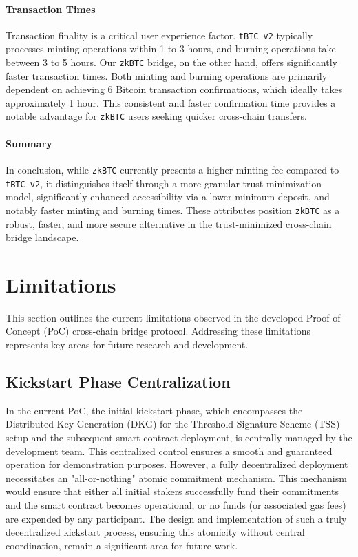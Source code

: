 \documentclass{DESSThesis}
\newcommand{\zktoken}{\texttt{zkBTC}}
\begin{document}
\paragraph{Transaction Times}
Transaction finality is a critical user experience factor. \texttt{tBTC v2} typically processes minting operations within 1 to 3 hours, and burning operations take between 3 to 5 hours. Our \texttt{\zktoken} bridge, on the other hand, offers significantly faster transaction times. Both minting and burning operations are primarily dependent on achieving 6 Bitcoin transaction confirmations, which ideally takes approximately 1 hour. This consistent and faster confirmation time provides a notable advantage for \texttt{\zktoken} users seeking quicker cross-chain transfers.

\paragraph{Summary}
In conclusion, while \texttt{\zktoken} currently presents a higher minting fee compared to \texttt{tBTC v2}, it distinguishes itself through a more granular trust minimization model, significantly enhanced accessibility via a lower minimum deposit, and notably faster minting and burning times. These attributes position \texttt{\zktoken} as a robust, faster, and more secure alternative in the trust-minimized cross-chain bridge landscape.


\section{Limitations} \label{sec:limitations}
This section outlines the current limitations observed in the developed Proof-of-Concept (PoC) cross-chain bridge protocol. Addressing these limitations represents key areas for future research and development.

\subsection{Kickstart Phase Centralization} \label{subsec:kickstart_limitation}
In the current PoC, the initial kickstart phase, which encompasses the Distributed Key Generation (DKG) for the Threshold Signature Scheme (TSS) setup and the subsequent smart contract deployment, is centrally managed by the development team. This centralized control ensures a smooth and guaranteed operation for demonstration purposes. However, a fully decentralized deployment necessitates an "all-or-nothing" atomic commitment mechanism. This mechanism would ensure that either all initial stakers successfully fund their commitments and the smart contract becomes operational, or no funds (or associated gas fees) are expended by any participant. The design and implementation of such a truly decentralized kickstart process, ensuring this atomicity without central coordination, remain a significant area for future work.
\end{document}
